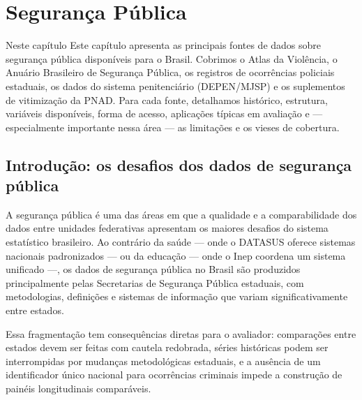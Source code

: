 
\chapter{Segurança Pública}

\begin{boxdestaque}{Neste capítulo}
Este capítulo apresenta as principais fontes de dados sobre segurança pública disponíveis para o Brasil. Cobrimos o Atlas da Violência, o Anuário Brasileiro de Segurança Pública, os registros de ocorrências policiais estaduais, os dados do sistema penitenciário (DEPEN/MJSP) e os suplementos de vitimização da PNAD. Para cada fonte, detalhamos histórico, estrutura, variáveis disponíveis, forma de acesso, aplicações típicas em avaliação e — especialmente importante nessa área — as limitações e os vieses de cobertura.
\end{boxdestaque}

\section{Introdução: os desafios dos dados de segurança pública}

A segurança pública é uma das áreas em que a qualidade e a comparabilidade dos dados entre unidades federativas apresentam os maiores desafios do sistema estatístico brasileiro. Ao contrário da saúde — onde o DATASUS oferece sistemas nacionais padronizados — ou da educação — onde o Inep coordena um sistema unificado —, os dados de segurança pública no Brasil são produzidos principalmente pelas Secretarias de Segurança Pública estaduais, com metodologias, definições e sistemas de informação que variam significativamente entre estados.

Essa fragmentação tem consequências diretas para o avaliador: comparações entre estados devem ser feitas com cautela redobrada, séries históricas podem ser interrompidas por mudanças metodológicas estaduais, e a ausência de um identificador único nacional para ocorrências criminais impede a construção de painéis longitudinais comparáveis.

